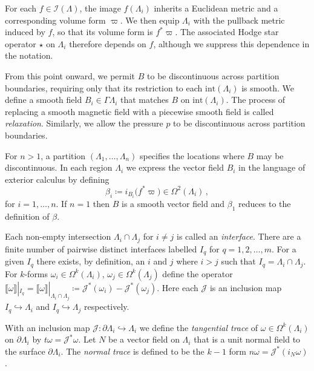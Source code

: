 \documentclass[11pt]{article}
\theoremstyle{plain}
\theoremstyle{definition}
\theoremstyle{remark}
\newcommand{\ST}{\Lambda}
\newcommand{\I}{\mathcal{I}(\ST)}
\begin{document}
For each \(f \in \I\), the image \(f(\ST_i)\) inherits a Euclidean metric and a corresponding volume form \(\varpi\). We then equip \(\ST_i\) with the pullback metric induced by \(f\), so that its volume form is \(f^{*}\varpi\). The associated Hodge star operator \(\star\) on \(\ST_i\) therefore depends on \(f\), although we suppress this dependence in the notation.


From this point onward, we permit \(B\) to be discontinuous across partition boundaries, requiring only that its restriction to each \(\mathrm{int}(\ST_i)\) is smooth. We define a smooth field \(B_i \in \Gamma \ST_i\) that matches \(B\) on \(\mathrm{int}(\ST_i)\). The process of replacing a smooth magnetic field with a piecewise smooth field is called \emph{relaxation}. Similarly, we allow the pressure \(p\) to be discontinuous across partition boundaries. 



For \(n>1\), a partition \((\ST_1,\dots,\ST_n)\) specifies the locations where \(B\) may be discontinuous. In each region \(\ST_i\) we express the vector field \(B_i\) in the language of exterior calculus by defining
\[
  \beta_i \coloneqq i_{B_i}\bigl(f^*\varpi\bigr)
  \in \Omega^2(\ST_i) \, ,
\]
for \(i=1,\dots,n\). If \(n=1\) then \(B\) is a smooth vector field and \(\beta _1\) reduces to the definition of \(\beta \).


Each non-empty intersection \(\ST_i \cap \ST_j\) for \(i \neq j\) is called an \textit{interface}. There are a finite number of pairwise distinct interfaces labelled \(I_q\) for \(q = 1, 2, \dots, m\). For a given \(I_q\) there exists, by definition, an \(i\) and \(j\) where \(i > j\) such that \(I_q = \ST_i \cap \ST_j\). For \(k\)-forms \(\omega_i \in \Omega^k(\ST_i)\), \(\omega_j \in \Omega^k(\ST_j)\) define the operator \(\llbracket \omega \rrbracket |_{I_q} = \llbracket \omega \rrbracket |_{\ST_i \cap \ST_j} \coloneqq \mathcal{J}^* ( \omega_{i}) - \mathcal{J}^* (\omega_{j} ) \). Here each \(\mathcal{J}\) is an inclusion map \(I_q \hookrightarrow \ST_i\) and \(I_q \hookrightarrow \ST_j\) respectively. 


With an inclusion map \(\mathcal{J} : \partial  \ST_i \hookrightarrow  \ST_i\) we define the \textit{tangential trace} of \(\omega \in \Omega^k(\ST_i) \) on \(\partial  \ST_i\) by \(t \omega = \mathcal{J}^* \omega\). Let \(N\) be a vector field on \(\ST_i\) that is a unit normal field to the surface \( \partial  \ST_i \). The \textit{normal trace} is defined to be the \(k-1\) form \(n \omega = \mathcal{J}^* ( i_N \omega )\).
\end{document}
